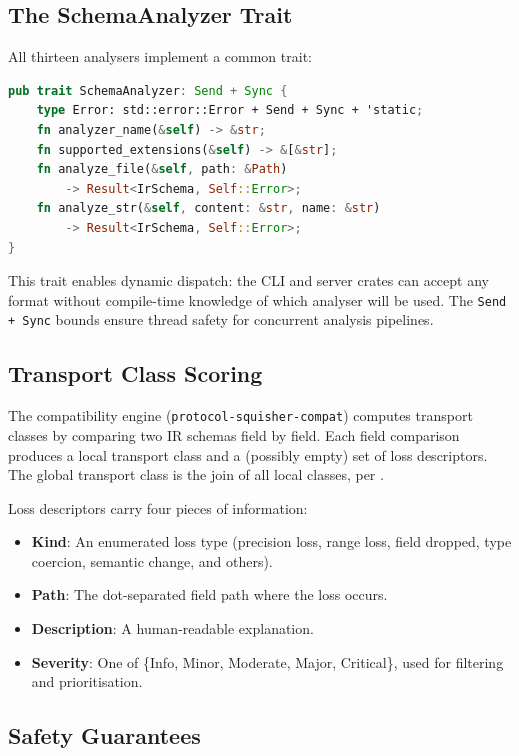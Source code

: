 \documentclass[11pt,a4paper]{article}
\theoremstyle{definition}
\theoremstyle{remark}
\begin{document}
\subsection{The SchemaAnalyzer Trait}

All thirteen analysers implement a common trait:

\begin{lstlisting}[language=Rust, caption={The universal analyser
  trait.}, label={lst:analyzer}]
pub trait SchemaAnalyzer: Send + Sync {
    type Error: std::error::Error + Send + Sync + 'static;
    fn analyzer_name(&self) -> &str;
    fn supported_extensions(&self) -> &[&str];
    fn analyze_file(&self, path: &Path)
        -> Result<IrSchema, Self::Error>;
    fn analyze_str(&self, content: &str, name: &str)
        -> Result<IrSchema, Self::Error>;
}
\end{lstlisting}

This trait enables dynamic dispatch: the CLI and server crates can
accept any format without compile-time knowledge of which analyser
will be used. The \texttt{Send + Sync} bounds ensure thread safety
for concurrent analysis pipelines.

\subsection{Transport Class Scoring}

The compatibility engine (\texttt{protocol-squisher-compat}) computes
transport classes by comparing two IR schemas field by field. Each
field comparison produces a local transport class and a (possibly
empty) set of loss descriptors. The global transport class is the
join of all local classes, per .

Loss descriptors carry four pieces of information:
\begin{itemize}
  \item \textbf{Kind}: An enumerated loss type (precision loss, range
    loss, field dropped, type coercion, semantic change, and others).
  \item \textbf{Path}: The dot-separated field path where the loss
    occurs.
  \item \textbf{Description}: A human-readable explanation.
  \item \textbf{Severity}: One of \{Info, Minor, Moderate, Major,
    Critical\}, used for filtering and prioritisation.
\end{itemize}

\subsection{Safety Guarantees}
\end{document}
